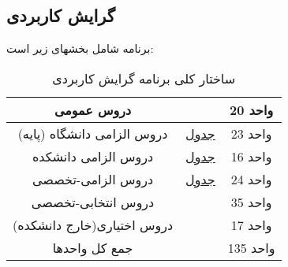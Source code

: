 \documentclass{article}
\begin{document}
    \subsection{
	گرایش کاربردی
}
برنامه شامل بخشهای زیر است:
    \begin{table}[H]
\begin{center}
	\begin{tabular}{|c | c | c|}
		\hline
		{دروس عمومی} & & {20 واحد} \\
		\hline
		{دروس الزامی دانشگاه (پایه)}\LR{)} & {
		\href{math-t1}{
		جدول
		}
		} & {23 واحد} \\
		\hline
		{دروس الزامی دانشکده} & {
			\href{math-t2}{
			جدول 
			}
			
			} & {16 واحد} \\
		\hline
		{دروس الزامی-تخصصی} & {
				\href{math-t3-1}{
				جدول 
				}
		} & {24 واحد} \\
		\hline
		{دروس انتخابی-تخصصی} & & {35 واحد} \\
		\hline
		{دروس اختیاری(خارج دانشکده) } & & {17 واحد} \\
		\hline
		{جمع کل واحدها} & & {135 واحد} \\
		\hline
	\end{tabular}
    \end{center}
    \caption{\label{math-t3-2}
	ساختار کلی برنامه گرایش کاربردی
	   }
    \end{table}
\end{document}
